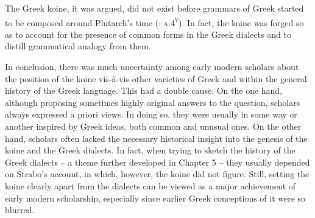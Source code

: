 The Greek koine, it was argued, did not exist before grammars of Greek started to be composed around Plutarch’s time (\citealt{KirchmaierThryllitsch1709}: \textsc{a.4}\textsc{\textsuperscript{v}}). In fact, the koine was forged so as to account for the presence of common forms in the Greek dialects and to distill grammatical analogy from them.

In conclusion, there was much uncertainty among early modern scholars about the position of the koine vis-à-vis other varieties of Greek and within the general history of the Greek language. This had a double cause. On the one hand, although proposing sometimes highly original answers to the question, scholars always expressed a priori views. In doing so, they were usually in some way or another inspired by Greek ideas, both common and unusual ones. On the other hand, scholars often lacked the necessary historical insight into the genesis of the koine and the Greek dialects. In fact, when trying to sketch the history of the Greek dialects – a theme further developed in Chapter 5 – they usually depended on Strabo’s account, in which, however, the koine did not figure. Still, setting the koine clearly apart from the dialects can be viewed as a major achievement of early modern scholarship, especially since earlier Greek conceptions of it were so blurred.

